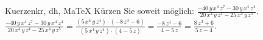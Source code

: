 \begin{MAufgabe}{Kuerzen}{kr, dh, MaTeX}
K\"urzen Sie soweit m\"oglich: $\frac{ - 40\, y\, x^4\, z^7 - 30\, y\, x^4\, z^4}{20\, x^4\, y\, z^4 - 25\, x^4\, y\, z^5}$.\\ 
\ifLsg\MLoesung
\quad $\frac{ - 40\, y\, x^4\, z^7 - 30\, y\, x^4\, z^4}{20\, x^4\, y\, z^4 - 25\, x^4\, y\, z^5}=\frac{(5\, x^4\, y\, z^4)\cdot( - 8\, z^3 - 6)}{(5\, x^4\, y\, z^4)\cdot(4 - 5\, z)}=\frac{ - 8\, z^3 - 6}{4 - 5\, z}=\frac{8\, z^3 + 6}{5\, z - 4}$.\else\relax\fi
 \end{MAufgabe}
